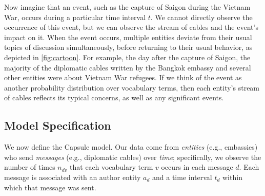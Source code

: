 Now imagine that an event, such as the capture of Saigon during the
Vietnam War, occurs during a particular time interval $t$. We cannot
directly observe the occurrence of this event, but we can observe the
stream of cables and the event's impact on it. When the event occurs,
multiple entities deviate from their usual topics of discussion
simultaneously, before returning to their usual behavior, as depicted
in \cref{fig:cartoon}. For example, the day after the capture of
Saigon, the majority of the diplomatic cables written by the Bangkok
embassy and several other entities were about Vietnam War refugees. If
we think of the event as another probability distribution over
vocabulary terms, then each entity's stream of cables reflects its
typical concerns, as well as any significant events.




\subsection{Model Specification}
\label{sec:model_spec}

We now define the Capsule model. Our data come from \emph{entities}
(e.g., embassies) who send \emph{messages} (e.g., diplomatic cables)
over \emph{time}; specifically, we observe the number of times
$n_{dv}$ that each vocabulary term $v$ occurs in each message
$d$. Each message is associated with an author entity $a_d$ and a time
interval $t_d$ within which that message was sent.

